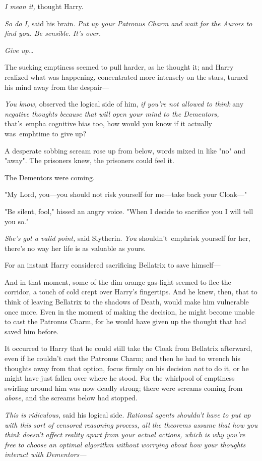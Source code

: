 \emph{I mean it,} thought Harry.

\emph{So do I,} said his brain. \emph{Put up your Patronus Charm and wait for 
the Aurors to find you. Be sensible. It's over.}

\emph{Give up{\ldots}}

The sucking emptiness seemed to pull harder, as he thought it; and Harry 
realized what was happening, concentrated more intensely on the stars, turned 
his mind away from the despair---

\emph{You know,} observed the logical side of him, \emph{if you're not allowed 
to think} any \emph{negative thoughts because that will open your mind to the 
Dementors,} that's\ emph{a cognitive bias too, how would you know if it 
actually} was\ emph{time to give up?}

A desperate sobbing scream rose up from below, words mixed in like "no" and 
"away". The prisoners knew, the prisoners could feel it.

The Dementors were coming.

"My Lord, you---you should not risk yourself for me---take back your Cloak---"

"Be silent, fool," hissed an angry voice. "When I decide to sacrifice you I 
will tell you so."

\emph{She's got a valid point,} said Slytherin. \emph{You} shouldn't\ emph{risk 
yourself for her, there's no way her life is as valuable as yours.}

For an instant Harry considered sacrificing Bellatrix to save himself---

And in that moment, some of the dim orange gas-light seemed to flee the 
corridor, a touch of cold crept over Harry's fingertips. And he knew, then, 
that to think of leaving Bellatrix to the shadows of Death, would make him 
vulnerable once more. Even in the moment of making the decision, he might 
become unable to cast the Patronus Charm, for he would have given up the 
thought that had saved him before.

It occurred to Harry that he could still take the Cloak from Bellatrix 
afterward, even if he couldn't cast the Patronus Charm; and then he had to 
wrench his thoughts away from that option, focus firmly on his decision 
\emph{not} to do it, or he might have just fallen over where he stood. For the 
whirlpool of emptiness swirling around him was now deadly strong; there were 
screams coming from \emph{above}, and the screams below had stopped.

\emph{This is ridiculous,} said his logical side. \emph{Rational agents 
shouldn't have to put up with this sort of censored reasoning process, all the 
theorems assume that how you think doesn't affect reality apart from your 
actual actions, which is why you're free to choose an optimal algorithm without 
worrying about how your thoughts interact with Dementors---}

